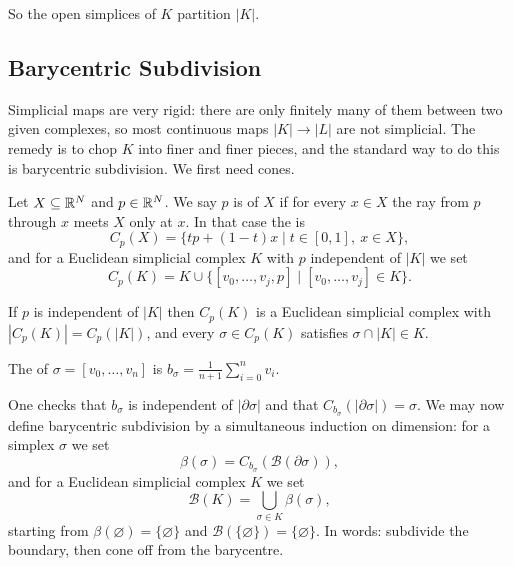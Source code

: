 \documentclass[a4paper]{scrartcl}
\newcommand{\bary}{\mathcal{B}}
\begin{document}
So the open simplices of $K$ partition $|K|$.

\subsection{Barycentric Subdivision}

Simplicial maps are very rigid: there are only finitely many of them between two given
complexes, so most continuous maps $|K|\to|L|$ are not simplicial. The remedy is to chop
$K$ into finer and finer pieces, and the standard way to do this is barycentric
subdivision. We first need cones.

\begin{definition}
	Let $X \subseteq \mathbb{R}^N$ and $p \in \mathbb{R}^N$. We say $p$ is  of $X$ if for every $x \in X$ the ray from $p$ through $x$ meets $X$ only at $x$. In that case the  is
	$$
	C_p(X) = \{tp + (1-t)x \mid t \in [0,1],\ x \in X\},
	$$
	and for a Euclidean simplicial complex $K$ with $p$ independent of $|K|$ we set
	$$
	C_p(K) = K \cup \{[v_0,\dots,v_j,p] \mid [v_0,\dots,v_j]\in K\}.
	$$
\end{definition}

\begin{lemma} \label{lem:cone}
	If $p$ is independent of $|K|$ then $C_p(K)$ is a Euclidean simplicial complex with $|C_p(K)| = C_p(|K|)$, and every $\sigma \in C_p(K)$ satisfies $\sigma \cap |K| \in K$.
\end{lemma}

\begin{definition}[Barycentre]
	The  of $\sigma = [v_0,\dots,v_n]$ is $b_\sigma = \frac{1}{n+1}\sum_{i=0}^n v_i$.
\end{definition}

One checks that $b_\sigma$ is independent of $|\partial\sigma|$ and that
$C_{b_\sigma}(|\partial\sigma|) = \sigma$. We may now define barycentric subdivision by a
simultaneous induction on dimension: for a simplex $\sigma$ we set
$$
\beta(\sigma) = C_{b_\sigma}(\bary(\partial\sigma)),
$$
and for a Euclidean simplicial complex $K$ we set
$$
\bary(K) = \bigcup_{\sigma \in K}\beta(\sigma),
$$
starting from $\beta(\varnothing) = \{\varnothing\}$ and $\bary(\{\varnothing\}) = \{\varnothing\}$.
In words: subdivide the boundary, then cone off from the barycentre.
\end{document}
